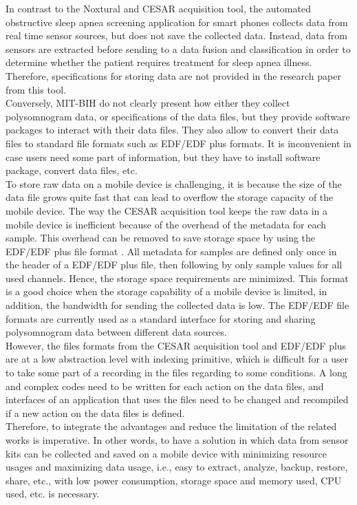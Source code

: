 In contrast to the Noxtural and CESAR acquisition tool, the automated obstructive sleep apnea screening application for smart phones collects data from real time sensor sources, but does not save the collected data. Instead, data from sensors are extracted before sending to a data fusion and classification in order to determine whether the patient requires treatment for sleep apnea illness. Therefore, specifications for storing data are not provided in the research paper from this tool.\\
Conversely, MIT-BIH do not clearly present how either they collect polysomnogram data, or specifications of the data files, but they provide software packages to interact with their data files. They also allow to convert their data files to standard file formats such as EDF/EDF plus formats. It is inconvenient in case users need some part of information, but they have to install software package, convert data files, etc.\\
To store raw data on a mobile device is challenging, it is because the size of the data file grows quite fast that can lead to overflow the storage capacity of the mobile device. The way the CESAR acquisition tool keeps the raw data in a mobile device is inefficient because of the overhead of the metadata for each sample. This overhead can be removed to save storage space by using the EDF/EDF plus file format \citep{EDF1}. All metadata for samples are defined only once in the header of a EDF/EDF plus file, then following by only sample values for all used channels. Hence, the storage space requirements are minimized. This format is a good choice when the storage capability of a mobile device is limited, in addition, the bandwidth for sending the collected data is low. The EDF/EDF file formats are currently used as a standard interface for storing and sharing polysomnogram data between different data sources.\\
However, the files formats from the CESAR acquisition tool and EDF/EDF plus are at a low abstraction level with indexing primitive, which is difficult for a user to take some part of a recording in the files regarding to some conditions. A long and complex codes need to be written for each action on the data files, and interfaces of an application that uses the files need to be changed and recompiled if a new action on the data files is defined.\\
Therefore, to integrate the advantages and reduce the limitation of the related works is imperative. In other words, to have a solution in which data from sensor kits can be collected and saved on a mobile device with minimizing resource usages and maximizing data usage, i.e., easy to extract, analyze, backup, restore, share, etc., with low power consumption, storage space and memory used, CPU used, etc. is necessary.
